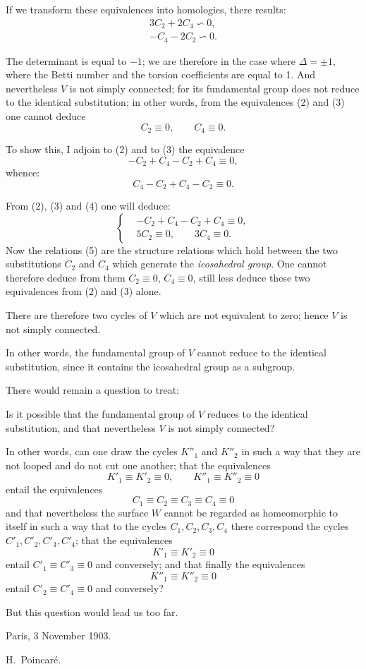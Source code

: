 \documentclass{article}
\begin{document}
If we transform these equivalences into homologies, there results:
\[ \begin{gathered} 3C_{2} + 2C_{4} \backsim 0,\\ -C_{4} - 2C_{2} \backsim 0. \end{gathered} \]

The determinant is equal to $-1$; we are therefore in the case where $\Delta = \pm 1$, where the Betti number and the torsion coefficients are equal to 1. And nevertheless $V$ is not simply connected; for its fundamental group does not reduce to the identical substitution; in other words, from the equivalences (2) and (3) one cannot deduce
\[ C_{2} \equiv 0, \qquad C_{4} \equiv 0. \]

To show this, I adjoin to (2) and to (3) the equivalence
\[ -C_{2} + C_{4} - C_{2} + C_{4} \equiv 0, \tag{4} \]
whence:
\[ C_{4} - C_{2} + C_{4} - C_{2} \equiv 0. \]

From (2), (3) and (4) one will deduce:
\[ \left\{ \begin{aligned} &-C_{2} + C_{4} - C_{2} + C_{4} \equiv 0,\\ &5C_{2} \equiv 0, \qquad 3C_{4} \equiv 0. \end{aligned} \right. \tag{5} \]
Now the relations (5) are the structure relations which hold between the two substitutions $C_{2}$ and $C_{4}$ which generate the \emph{icosahedral group}. One cannot therefore deduce from them $C_{2} \equiv 0$, $C_{4} \equiv 0$, still less deduce these two equivalences from (2) and (3) alone.

There are therefore two cycles of $V$ which are not equivalent to zero; hence $V$ is not simply connected.

In other words, the fundamental group of $V$ cannot reduce to the identical substitution, since it contains the icosahedral group as a subgroup.

There would remain a question to treat:

Is it possible that the fundamental group of $V$ reduces to the identical substitution, and that nevertheless $V$ is not simply connected?

In other words, can one draw the cycles $K''_{1}$ and $K''_{2}$ in such a way that they are not looped and do not cut one another; that the equivalences
\[ K'_{1} \equiv K'_{2} \equiv 0, \qquad K''_{1} \equiv K''_{2} \equiv 0 \]
entail the equivalences
\[ C_{1} \equiv C_{2} \equiv C_{3} \equiv C_{4} \equiv 0 \]
and that nevertheless the surface $W$ cannot be regarded as homeomorphic to itself in such a way that to the cycles $C_{1}, C_{2}, C_{3}, C_{4}$ there correspond the cycles $C'_{1}, C'_{2}, C'_{3}, C'_{4}$; that the equivalences
\[ K'_{1} \equiv K'_{2} \equiv 0 \]
entail $C'_{1} \equiv C'_{3} \equiv 0$ and conversely; and that finally the equivalences
\[ K''_{1} \equiv K''_{2} \equiv 0 \]
entail $C'_{2} \equiv C'_{4} \equiv 0$ and conversely?

But this question would lead us too far.

Paris, 3 November 1903.

H.~Poincaré.
\end{document}
